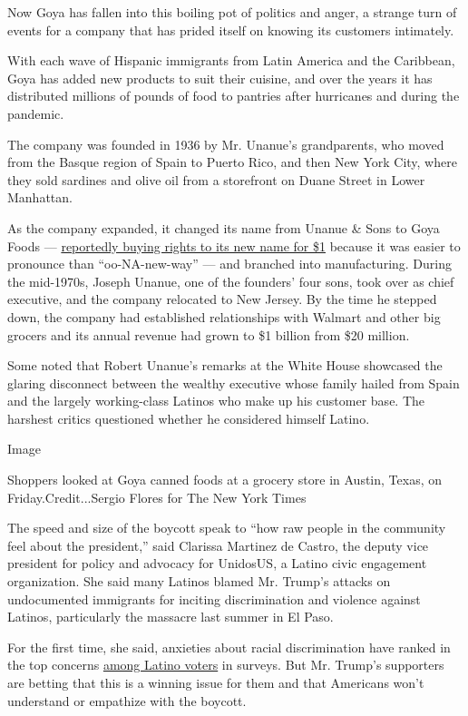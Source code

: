 Now Goya has fallen into this boiling pot of politics and anger, a
strange turn of events for a company that has prided itself on knowing
its customers intimately.

With each wave of Hispanic immigrants from Latin America and the
Caribbean, Goya has added new products to suit their cuisine, and over
the years it has distributed millions of pounds of food to pantries
after hurricanes and during the pandemic.

The company was founded in 1936 by Mr. Unanue's grandparents, who moved
from the Basque region of Spain to Puerto Rico, and then New York City,
where they sold sardines and olive oil from a storefront on Duane Street
in Lower Manhattan.

As the company expanded, it changed its name from Unanue \& Sons to Goya
Foods ---
\href{https://abcnews.go.com/Business/story?id=4507435\&page=1}{reportedly
buying rights to its new name for \$1} because it was easier to
pronounce than ``oo-NA-new-way'' --- and branched into manufacturing.
During the mid-1970s, Joseph Unanue, one of the founders' four sons,
took over as chief executive, and the company relocated to New Jersey.
By the time he stepped down, the company had established relationships
with Walmart and other big grocers and its annual revenue had grown to
\$1 billion from \$20 million.

Some noted that Robert Unanue's remarks at the White House showcased the
glaring disconnect between the wealthy executive whose family hailed
from Spain and the largely working-class Latinos who make up his
customer base. The harshest critics questioned whether he considered
himself Latino.

Image

Shoppers looked at Goya canned foods at a grocery store in Austin,
Texas, on Friday.Credit...Sergio Flores for The New York Times

The speed and size of the boycott speak to ``how raw people in the
community feel about the president,'' said Clarissa Martinez de Castro,
the deputy vice president for policy and advocacy for UnidosUS, a Latino
civic engagement organization. She said many Latinos blamed Mr. Trump's
attacks on undocumented immigrants for inciting discrimination and
violence against Latinos, particularly the massacre last summer in El
Paso.

For the first time, she said, anxieties about racial discrimination have
ranked in the top concerns
\href{https://www.unidosus.org/Assets/uploads/files/voting/UnidosUS_2020latinoelectoratesurvey_june2019.pdf}{among
Latino voters} in surveys. But Mr. Trump's supporters are betting that
this is a winning issue for them and that Americans won't understand or
empathize with the boycott.

